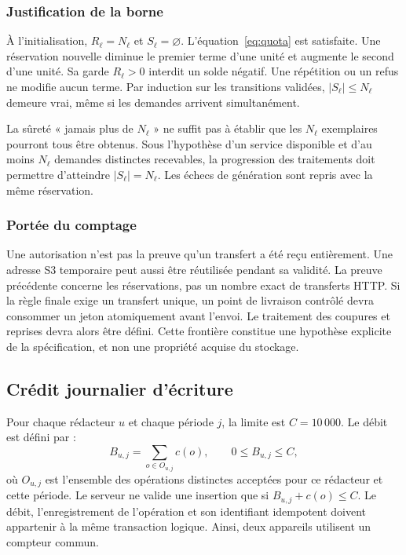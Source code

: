 \subsubsection{Justification de la borne}
À l'initialisation, $R_\ell=N_\ell$ et $S_\ell=\varnothing$. L'équation~\eqref{eq:quota} est satisfaite. Une réservation nouvelle diminue le premier terme d'une unité et augmente le second d'une unité. Sa garde $R_\ell>0$ interdit un solde négatif. Une répétition ou un refus ne modifie aucun terme. Par induction sur les transitions validées, $|S_\ell|\leq N_\ell$ demeure vrai, même si les demandes arrivent simultanément.

La sûreté « jamais plus de $N_\ell$ » ne suffit pas à établir que les $N_\ell$ exemplaires pourront tous être obtenus. Sous l'hypothèse d'un service disponible et d'au moins $N_\ell$ demandes distinctes recevables, la progression des traitements doit permettre d'atteindre $|S_\ell|=N_\ell$. Les échecs de génération sont repris avec la même réservation.

\subsubsection{Portée du comptage}
Une autorisation n'est pas la preuve qu'un transfert a été reçu entièrement. Une adresse S3 temporaire peut aussi être réutilisée pendant sa validité. La preuve précédente concerne les réservations, pas un nombre exact de transferts HTTP. Si la règle finale exige un transfert unique, un point de livraison contrôlé devra consommer un jeton atomiquement avant l'envoi. Le traitement des coupures et reprises devra alors être défini. Cette frontière constitue une hypothèse explicite de la spécification, et non une propriété acquise du stockage.

\subsection{Crédit journalier d'écriture}
Pour chaque rédacteur $u$ et chaque période $j$, la limite est $C=10\,000$. Le débit est défini par :
\begin{equation}
B_{u,j}=\sum_{o\in O_{u,j}}c(o),\qquad 0\leq B_{u,j}\leq C,
\label{eq:credit}
\end{equation}
où $O_{u,j}$ est l'ensemble des opérations distinctes acceptées pour ce rédacteur et cette période. Le serveur ne valide une insertion que si $B_{u,j}+c(o)\leq C$. Le débit, l'enregistrement de l'opération et son identifiant idempotent doivent appartenir à la même transaction logique. Ainsi, deux appareils utilisent un compteur commun.

